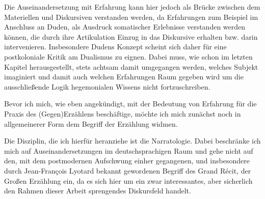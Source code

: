 Die Auseinandersetzung mit Erfahrung kann hier jedoch als Brücke zwischen dem
Materiellen und Diskursiven verstanden werden, da Erfahrungen zum Beispiel im
Anschluss an Duden\footnotemark {}, als Ausdruck somatischer Erlebnisse verstanden werden
können, die durch ihre Artikulation Einzug in das Diskursive erhalten bzw.
darin intervenieren. Insbesondere Dudens Konzept scheint sich daher für eine
postkoloniale Kritik am Dualismus zu eignen. Dabei muss, wie schon im letzten
Kapitel herausgestellt, stets achtsam damit umgegangen werden, welches Subjekt
imaginiert und damit auch welchen Erfahrungen Raum gegeben wird um die
ausschließende Logik hegemonialen Wissens nicht fortzuschreiben. 

Bevor ich mich, wie eben angekündigt, mit der Bedeutung von Erfahrung für die
Praxis des (Gegen)Erzählens beschäftige, möchte ich mich zunächst noch in
allgemeinerer Form dem Begriff der Erzählung widmen. 

Die Disziplin, die ich hierfür heranziehe ist die Narratologie. Dabei
beschränke ich mich auf Auseinandersetzungen im deutschsprachigen Raum und gehe
nicht auf den, mit dem postmodernen Aufschwung einher gegangenen, und
insbesondere durch Jean-François Lyotard bekannt gewordenen Begriff des Grand
Récit, der Großen Erzählung ein, da es sich hier um ein zwar interessantes,
aber sicherlich den Rahmen dieser Arbeit sprengendes Diskursfeld handelt.

